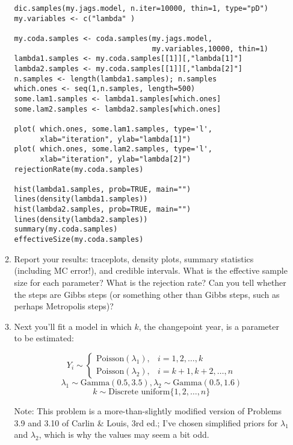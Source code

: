 \documentclass[11pt]{article}
\begin{document}
\begin{enumerate}
\begin{enumerate}
\begin{verbatim}
dic.samples(my.jags.model, n.iter=10000, thin=1, type="pD")
my.variables <- c("lambda" )

my.coda.samples <- coda.samples(my.jags.model,
                                my.variables,10000, thin=1)
lambda1.samples <- my.coda.samples[[1]][,"lambda[1]"]
lambda2.samples <- my.coda.samples[[1]][,"lambda[2]"]
n.samples <- length(lambda1.samples); n.samples
which.ones <- seq(1,n.samples, length=500)
some.lam1.samples <- lambda1.samples[which.ones]
some.lam2.samples <- lambda2.samples[which.ones]

plot( which.ones, some.lam1.samples, type='l',
      xlab="iteration", ylab="lambda[1]")
plot( which.ones, some.lam2.samples, type='l',
      xlab="iteration", ylab="lambda[2]")
rejectionRate(my.coda.samples)

hist(lambda1.samples, prob=TRUE, main="")
lines(density(lambda1.samples))
hist(lambda2.samples, prob=TRUE, main="")
lines(density(lambda2.samples))
summary(my.coda.samples)
effectiveSize(my.coda.samples)
\end{verbatim}

\item Report your results: traceplots, density plots,
summary statistics (including MC error!), and credible intervals. 
What is the effective sample size for each parameter? What is
the rejection rate? Can you tell whether the steps are Gibbs steps (or
something other than Gibbs steps, such as perhaps Metropolis steps)?


\pagebreak

\item Next you'll fit a model in which $k$, the changepoint year, is a parameter 
to be estimated:

$$Y_i \sim \left\{
\begin{array}{ll}
{\mbox{Poisson}}(\lambda_1), & i = 1,2,\ldots,k \\
{\mbox{Poisson}}(\lambda_2), & i = k+1,k+2,\ldots,n
\end{array}\right.$$
$$\lambda_1 \sim {\mbox{Gamma}}(0.5,3.5), \lambda_2 \sim {\mbox{Gamma}}(0.5,1.6)$$
$$k \sim {\mbox{Discrete uniform}} \{1,2,\ldots,n \}$$

\vspace{.05in}
Note: This problem is a more-than-slightly modified version of Problems 3.9 and 3.10 of
Carlin \& Louis, 3rd ed.; I've chosen simplified priors for $\lambda_1$ and $\lambda_2$,
which is why the values may seem a bit odd.


\end{enumerate}
\end{enumerate}
\end{document}
